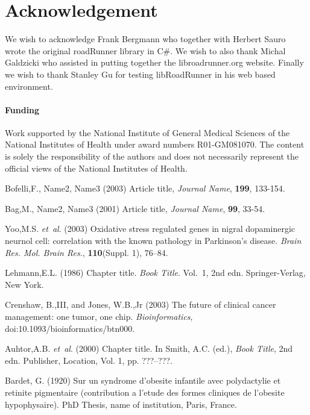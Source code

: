 \documentclass{bioinfo}
\begin{document}
\section*{Acknowledgement}
We wish to acknowledge Frank Bergmann who together with Herbert Sauro wrote the original roadRunner library in C\#. We wish to also thank Michal Galdzicki who assisted in putting together the libroadrunner.org website. Finally we wish to thank Stanley Gu for testing libRoadRunner in his web based environment.

\paragraph{Funding\textcolon} Work supported by the National Institute of General Medical Sciences of the National Institutes of Health under award numbers R01-GM081070. The content is solely the responsibility of the authors and does not necessarily represent the official views of the National Institutes of Health.

%
%
%
%
%
%
%
%
%


\begin{thebibliography}{}
 Bofelli,F., Name2, Name3 (2003) Article title, {\it Journal Name}, {\bf 199}, 133-154.

 Bag,M., Name2, Name3 (2001) Article title, {\it Journal Name}, {\bf 99}, 33-54.

Yoo,M.S. \textit{et~al}. (2003) Oxidative stress regulated genes
in nigral dopaminergic neurnol cell: correlation with the known
pathology in Parkinson's disease. \textit{Brain Res. Mol. Brain
Res.}, \textbf{110}(Suppl. 1), 76--84.

Lehmann,E.L. (1986) Chapter title. \textit{Book Title}. Vol.~1, 2nd edn. Springer-Verlag, New York.

Crenshaw, B.,III, and Jones, W.B.,Jr (2003) The future of clinical
cancer management: one tumor, one chip. \textit{Bioinformatics},
doi:10.1093/bioinformatics/btn000.

Auhtor,A.B. \textit{et~al}. (2000) Chapter title. In Smith, A.C.
(ed.), \textit{Book Title}, 2nd edn. Publisher, Location, Vol. 1, pp.
???--???.

Bardet, G. (1920) Sur un syndrome d'obesite infantile avec
polydactylie et retinite pigmentaire (contribution a l'etude des
formes cliniques de l'obesite hypophysaire). PhD Thesis, name of
institution, Paris, France.

\end{thebibliography}
\end{document}
